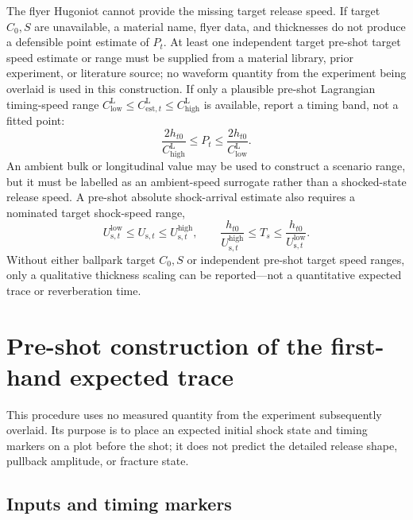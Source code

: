 \documentclass[11pt]{article}
\begin{document}
The flyer Hugoniot cannot provide the missing target release speed.  If target
$C_0,S$ are unavailable, a material name, flyer data, and thicknesses do not
produce a defensible point estimate of $P_t$.  At least one independent target
pre-shot target speed estimate or range must be supplied from a material
library, prior experiment, or literature source; no waveform quantity from
the experiment being overlaid is used in this construction.  If only a
plausible pre-shot Lagrangian timing-speed range
$C_{\mathrm{low}}^{\mathrm L}\leq C_{\mathrm{est},t}^{\mathrm L}
\leq C_{\mathrm{high}}^{\mathrm L}$ is available, report a timing band,
not a fitted point:
\begin{equation}
  \frac{2h_{t0}}{C_{\mathrm{high}}^{\mathrm L}}
  \leq P_t\leq
  \frac{2h_{t0}}{C_{\mathrm{low}}^{\mathrm L}}.
  \label{eq:first-hand-timing-band}
\end{equation}
An ambient bulk or longitudinal value may be used to construct a scenario
range, but it must be labelled as an ambient-speed surrogate rather than a
shocked-state release speed.  A pre-shot absolute shock-arrival estimate also
requires a nominated target shock-speed range,
\begin{equation}
  U_{\mathrm{s},t}^{\mathrm{low}}\leq U_{\mathrm{s},t}
  \leq U_{\mathrm{s},t}^{\mathrm{high}},
  \qquad
  \frac{h_{t0}}{U_{\mathrm{s},t}^{\mathrm{high}}}
  \leq T_s\leq
  \frac{h_{t0}}{U_{\mathrm{s},t}^{\mathrm{low}}}.
  \label{eq:first-hand-shock-arrival-band}
\end{equation}
Without either ballpark target $C_0,S$ or independent pre-shot target speed
ranges, only a qualitative thickness scaling can be reported---not a
quantitative expected trace or reverberation time.

\section{Pre-shot construction of the first-hand expected trace}
\label{sec:pre-shot-overlay}

This procedure uses no measured quantity from the experiment subsequently
overlaid.  Its purpose is to place an expected initial shock state and timing
markers on a plot before the shot; it does not predict the detailed release
shape, pullback amplitude, or fracture state.

\subsection{Inputs and timing markers}
\end{document}
